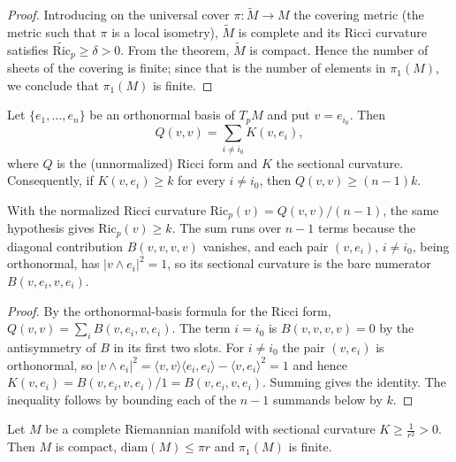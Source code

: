 \begin{proof}

  \sketch
  Introducing on the universal cover $\pi:\tilde M\to M$ the covering metric
  (the metric such that $\pi$ is a local isometry), $\tilde M$ is complete and its
  Ricci curvature satisfies $\widetilde{\mathrm{Ric}}_p\ge\delta>0$. From the theorem,
  $\tilde M$ is compact. Hence the number of sheets of the covering is finite; since
  that is the number of elements in $\pi_1(M)$, we conclude that $\pi_1(M)$ is
  finite.
\end{proof}
\begin{lemma}
  \label{lem:dc-ch9-3-3-ricci-sectional}


  Let $\{e_1,\dots,e_n\}$ be an orthonormal basis of $T_pM$ and put $v=e_{i_0}$. Then
  $$
  Q(v,v)=\sum_{i\ne i_0}K(v,e_i),
  $$
  where $Q$ is the (unnormalized) Ricci form and $K$ the sectional curvature.
  Consequently, if $K(v,e_i)\ge k$ for every $i\ne i_0$, then $Q(v,v)\ge(n-1)k$.

  With the normalized Ricci curvature
  $\mathrm{Ric}_p(v)=Q(v,v)/(n-1)$, the same hypothesis gives
  $\mathrm{Ric}_p(v)\ge k$. The sum runs over $n-1$ terms because the diagonal contribution $B(v,v,v,v)$
  vanishes, and each pair $(v,e_i)$, $i\ne i_0$, being orthonormal, has $|v\wedge e_i|^2=1$,
  so its sectional curvature is the bare numerator $B(v,e_i,v,e_i)$.
\end{lemma}
\begin{proof}

  \sketch
  By the orthonormal-basis formula for the Ricci form, $Q(v,v)=\sum_i B(v,e_i,v,e_i)$. The
  term $i=i_0$ is $B(v,v,v,v)=0$ by the antisymmetry of $B$ in its first two slots. For
  $i\ne i_0$ the pair $(v,e_i)$ is orthonormal, so
  $|v\wedge e_i|^2=\langle v,v\rangle\langle e_i,e_i\rangle-\langle v,e_i\rangle^2=1$ and
  hence $K(v,e_i)=B(v,e_i,v,e_i)/1=B(v,e_i,v,e_i)$. Summing gives the identity. The
  inequality follows by bounding each of the $n-1$ summands below by $k$.
\end{proof}
\begin{corollary}
  \label{cor:dc-ch9-3-3}
  Let $M$ be a complete Riemannian manifold with sectional curvature
  $K\ge\frac{1}{r^2}>0$. Then $M$ is compact, $\mathrm{diam}(M)\le\pi r$ and
  $\pi_1(M)$ is finite.
\end{corollary}
